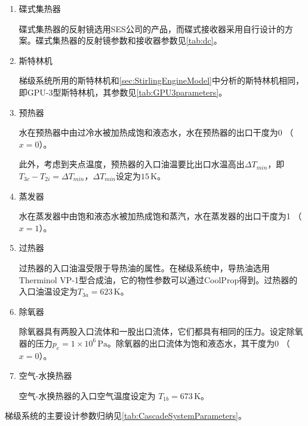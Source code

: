 \begin{enumerate}[label=(\arabic*)]
\item 碟式集热器

碟式集热器的反射镜选用SES公司的产品，而碟式接收器采用自行设计的方案。碟式集热器的反射镜参数和接收器参数见\autoref{tab:dc}。

\item 斯特林机

梯级系统所用的斯特林机和\autoref{sec:StirlingEngineModel}中分析的斯特林机相同，即GPU-3型斯特林机，其参数见\autoref{tab:GPU3parameters}。

\item 预热器

水在预热器中由过冷水被加热成饱和液态水，水在预热器的出口干度为0 （$x = 0$）。

此外，考虑到夹点温度，预热器的入口油温要比出口水温高出$\Delta T_{min}$，即$T_{3c} - T_{2i} = \Delta T_{min}$，$\Delta T_{min}$设定为$15\,\mathrm{K}$。

\item 蒸发器

水在蒸发器中由饱和液态水被加热成饱和蒸汽，水在蒸发器的出口干度为1 （$x = 1$）。

\item 过热器

过热器的入口油温受限于导热油的属性。在梯级系统中，导热油选用Therminol VP-1型合成油，它的物性参数可以通过CoolProp得到。过热器的入口油温设定为$T_{3a} = 623\,\mathrm{K}$。

\item 除氧器

除氧器具有两股入口流体和一股出口流体，它们都具有相同的压力。设定除氧器的压力$p_e = 1\times10^6\,\mathrm{Pa}$。除氧器的出口流体为饱和液态水，其干度为0 （$x = 0$）。

\item 空气-水换热器

空气-水换热器的入口空气温度设定为 $T_{1b} = 673\,\mathrm{K}$。
\end{enumerate}

\smallskip{}
梯级系统的主要设计参数归纳见\autoref{tab:CascadeSystemParameters}。

